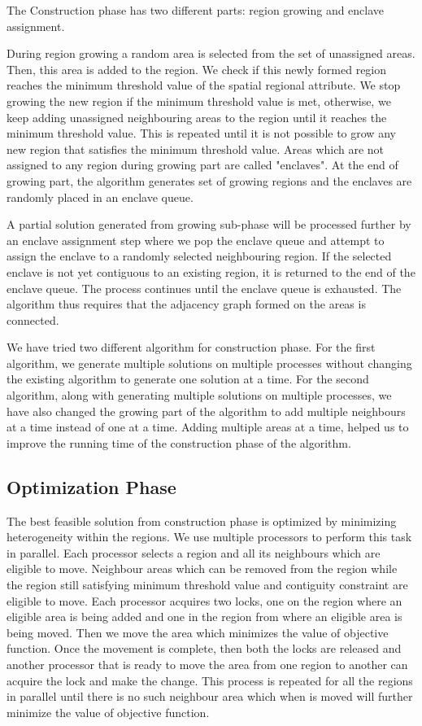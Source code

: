 \documentclass[conference]{IEEEtran}
\begin{document}
The Construction phase has two different parts: region growing and enclave
assignment.

During region growing a random area is selected from the set of unassigned
areas. Then, this area is added to the region. We check if this newly
formed region reaches the minimum threshold value of the spatial regional attribute.
We stop growing the new region if the minimum threshold value is met, otherwise, we
keep adding unassigned neighbouring areas to the region until it reaches the
minimum threshold value. This is repeated until it is not possible to grow any
new region that satisfies the minimum threshold value. Areas which are not assigned
to any region during growing part are called "enclaves". At the end of growing
part, the algorithm generates set of growing regions and the enclaves are
randomly placed in an enclave queue.

A partial solution generated from growing sub-phase will be processed further by
an enclave assignment step where we pop the enclave queue and attempt to assign
the enclave to a randomly selected neighbouring region. If the selected enclave
is not yet contiguous to an existing region, it is returned to the end of the enclave
queue. The process continues until the enclave queue is exhausted. The algorithm
thus requires that the adjacency graph formed on the areas is connected.

We have tried two different algorithm for construction phase. For the first algorithm, we generate multiple solutions on multiple processes without changing the existing algorithm to generate one solution at a time. For the second algorithm, along with generating multiple solutions on multiple processes, we have also changed the growing part of the algorithm to add multiple neighbours at a time instead of one at a time. Adding multiple areas at a time, helped us to improve the running time of the construction phase of the algorithm.

\subsection{Optimization Phase}
The best feasible solution from construction phase is optimized
by minimizing heterogeneity within the regions. We use multiple processors to
perform this task in parallel. Each processor selects a region and all its
neighbours which are eligible to move. Neighbour areas which can be removed from
the region while the region still satisfying minimum threshold value and
contiguity constraint are eligible to move. Each processor acquires two locks,
one on the region where an eligible area is being added and one in the region from
where an eligible area is being moved. Then we move the area which minimizes the
value of objective function. Once the movement is complete, then both the locks
are released and another processor that is ready to move the area from one
region to another can acquire the lock and make the change. This process is
repeated for all the regions in parallel until there is no such neighbour area
which when is moved will further minimize the value of objective function.
\end{document}
